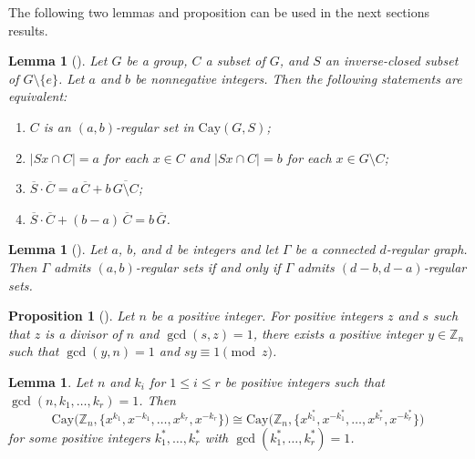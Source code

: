 \documentclass[12pt]{article}
\newtheorem{prop}[formula]{Proposition}
\newtheorem{lem}[formula]{Lemma}
\begin{document}
The following two lemmas and proposition can be used in the next sections results.
\begin{lem}[{\cite[Lemma~2.1]{WXZ}}]\label{Z}
	Let $G$ be a group, $C$ a subset of $G$, and $S$ an inverse-closed subset of $G\setminus\{e\}$.
	Let $a$ and $b$ be nonnegative integers. Then the following statements are equivalent:
	\begin{enumerate}
		\item[(i)] $C$ is an $(a,b)$-regular set in $\mathrm{Cay}(G,S)$;
		\item[(ii)] $|Sx \cap C| = a$ for each $x \in C$ and
		$|Sx \cap C| = b$ for each $x \in G \setminus C$;
		\item[(iii)] $\overline{S} \cdot\overline{C} = a\,\overline{C} + b\, \overline{G\setminus C}$;
		\item[(iv)] $\overline{S} \cdot\overline{C} + (b-a)\,\overline{C} = b\,\overline{G}$.
	\end{enumerate}
\end{lem}

\begin{lem}[{\cite[Lemma~2.4]{HW}}]\label{primes}
		Let $a$, $b$, and $d$ be integers and let $\Gamma$ be a connected $d$-regular graph.
		Then $\Gamma$ admits $(a,b)$-regular sets if and only if $\Gamma$ admits
		$(d-b,d-a)$-regular sets.
	\end{lem}
	\begin{prop}[{\cite[Proposition~1]{KSC}}]\label{gcd}
	Let $n$ be a positive integer. For positive integers $z$ and $s$ such that $z$ is a divisor of $n$ and $\gcd(s,z)=1$, there exists a positive integer $y \in \mathbb{Z}_n$ such that $\gcd(y,n)=1$ and $sy \equiv 1 \pmod{z}$.
	\end{prop}

\begin{lem}\label{CayC}
	Let $n$ and $k_i$ for \(1\!\le\!i\!\le\!r\) be positive integers such that
	$\gcd(n,k_1,\ldots,k_r)=1$.
	Then
	\[
	\mathrm{Cay}\bigl(\mathbb{Z}_n,\{x^{k_1},x^{-k_1},\ldots,x^{k_r},x^{-k_r}\}\bigr)
	\cong
	\mathrm{Cay}\bigl(\mathbb{Z}_n,\{x^{k_1^\ast},x^{-k_1^\ast},\ldots,x^{k_r^\ast},x^{-k_r^\ast}\}\bigr)
	\]
	for some positive integers $k_1^\ast,\ldots,k_r^\ast$ with
	$\gcd(k_1^\ast,\ldots,k_r^\ast)=1$.
\end{lem}
\end{document}
